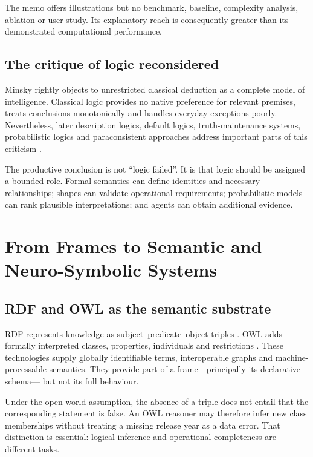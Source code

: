 \documentclass[11pt,a4paper]{article}
\begin{document}
The memo offers illustrations but no benchmark, baseline, complexity analysis,
ablation or user study. Its explanatory reach is consequently greater than its
demonstrated computational performance.

\subsection{The critique of logic reconsidered}

Minsky rightly objects to unrestricted classical deduction as a complete model
of intelligence. Classical logic provides no native preference for relevant
premises, treats conclusions monotonically and handles everyday exceptions
poorly. Nevertheless, later description logics, default logics,
truth-maintenance systems, probabilistic logics and paraconsistent approaches
address important parts of this criticism \citep{brachman1977structural,
reiter1980logic,dekleer1986atms}.

The productive conclusion is not ``logic failed''. It is that logic should be
assigned a bounded role. Formal semantics can define identities and necessary
relationships; shapes can validate operational requirements; probabilistic
models can rank plausible interpretations; and agents can obtain additional
evidence.

\section{From Frames to Semantic and Neuro-Symbolic Systems}

\subsection{RDF and OWL as the semantic substrate}

RDF represents knowledge as subject--predicate--object triples
\citep{rdf2014concepts}. OWL adds formally interpreted classes, properties,
individuals and restrictions \citep{owl2012overview}. These technologies supply
globally identifiable terms, interoperable graphs and machine-processable
semantics. They provide part of a frame---principally its declarative schema---
but not its full behaviour.

Under the open-world assumption, the absence of a triple does not entail that
the corresponding statement is false. An OWL reasoner may therefore infer new
class memberships without treating a missing release year as a data error. That
distinction is essential: logical inference and operational completeness are
different tasks.
\end{document}
